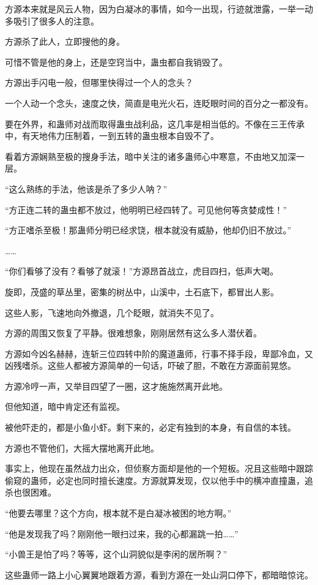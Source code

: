 \begin{this_body}
方源本来就是风云人物，因为白凝冰的事情，如今一出现，行迹就泄露，一举一动多吸引了很多人的注意。

方源杀了此人，立即搜他的身。

可惜不管是他的身上，还是空窍当中，蛊虫都自我销毁了。

方源出手闪电一般，但哪里快得过一个人的念头？

一个人动一个念头，速度之快，简直是电光火石，连眨眼时间的百分之一都没有。

要在外界，和蛊师对战而取得蛊虫战利品，这几率是相当低的。不像在三王传承中，有天地伟力压制着，一到五转的蛊虫根本自毁不了。

看着方源娴熟至极的搜身手法，暗中关注的诸多蛊师心中寒意，不由地又加深一层。

“这么熟练的手法，他该是杀了多少人呐？”

“方正连二转的蛊虫都不放过，他明明已经四转了。可见他何等贪婪成性！”

“方正嗜杀至极！那蛊师分明已经求饶，根本就没有威胁，他却仍旧不放过。”

……

“你们看够了没有？看够了就滚！”方源昂首战立，虎目四扫，低声大喝。

旋即，茂盛的草丛里，密集的树丛中，山溪中，土石底下，都冒出人影。

这些人影，飞速地向外撤退，几个眨眼，就消失不见了。

方源的周围又恢复了平静。很难想象，刚刚居然有这么多人潜伏着。

方源如今凶名赫赫，连斩三位四转中阶的魔道蛊师，行事不择手段，卑鄙冷血，又凶残嗜杀。这些人都被方源简单的一句话，吓破了胆，不敢在方源面前晃悠。

方源冷哼一声，又举目四望了一圈，这才施施然离开此地。

但他知道，暗中肯定还有监视。

被他吓走的，都是小鱼小虾。剩下来的，必定有独到的本身，有自信的本钱。

方源也不管他们，大摇大摆地离开此地。

事实上，他现在虽然战力出众，但侦察方面却是他的一个短板。况且这些暗中跟踪偷窥的蛊师，必定也同时擅长速度。方源就算发现，仅以他手中的横冲直撞蛊，追杀也很困难。

“他要去哪里？这个方向，根本就不是白凝冰被困的地方啊。”

“他是发现我了吗？刚刚他一眼扫过来，我的心都漏跳一拍……”

“小兽王是怕了吗？等等，这个山洞貌似是李闲的居所啊？”

这些蛊师一路上小心翼翼地跟着方源，看到方源在一处山洞口停下，都暗暗惊诧。


\end{this_body}
